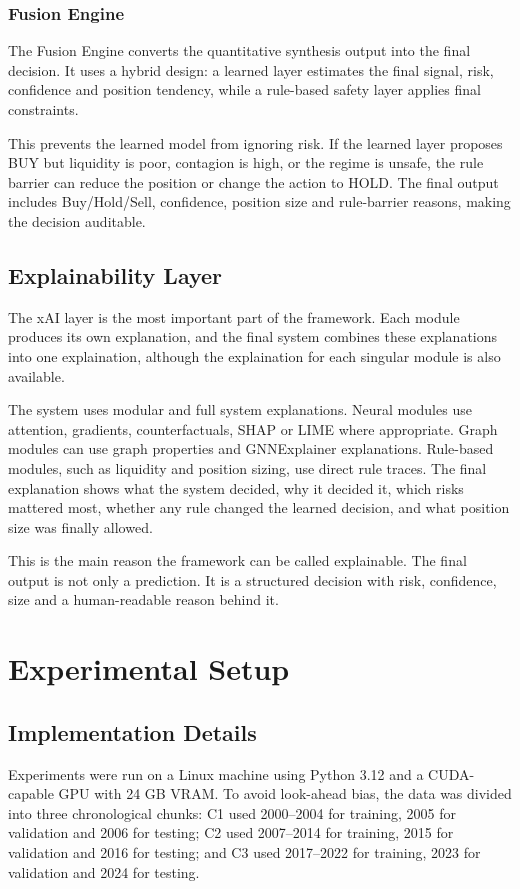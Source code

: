 \documentclass[conference]{IEEEtran}
\begin{document}
\subsubsection{Fusion Engine}
The Fusion Engine converts the quantitative synthesis output into the final decision. It uses a hybrid design: a learned layer estimates the final signal, risk, confidence and position tendency, while a rule-based safety layer applies final constraints.

This prevents the learned model from ignoring risk. If the learned layer proposes BUY but liquidity is poor, contagion is high, or the regime is unsafe, the rule barrier can reduce the position or change the action to HOLD. The final output includes Buy/Hold/Sell, confidence, position size and rule-barrier reasons, making the decision auditable.
\subsection{Explainability Layer}
The xAI layer is the most important part of the framework. Each module produces its own explanation, and the final system combines these explanations into one explaination, although the explaination for each singular module is also available.

The system uses modular and full system explanations. Neural modules use attention, gradients, counterfactuals, SHAP\cite{SHAP} or LIME\cite{LIME} where appropriate. Graph modules can use graph properties and GNNExplainer explanations. Rule-based modules, such as liquidity and position sizing, use direct rule traces. The final explanation shows what the system decided, why it decided it, which risks mattered most, whether any rule changed the learned decision, and what position size was finally allowed.

This is the main reason the framework can be called explainable. The final output is not only a prediction. It is a structured decision with risk, confidence, size and a human-readable reason behind it.

\section{Experimental Setup}

\subsection{Implementation Details}
Experiments were run on a Linux machine using Python 3.12 and a CUDA-capable GPU with 24 GB VRAM. To avoid look-ahead bias, the data was divided into three chronological chunks: C1 used 2000--2004 for training, 2005 for validation and 2006 for testing; C2 used 2007--2014 for training, 2015 for validation and 2016 for testing; and C3 used 2017--2022 for training, 2023 for validation and 2024 for testing.
\end{document}
